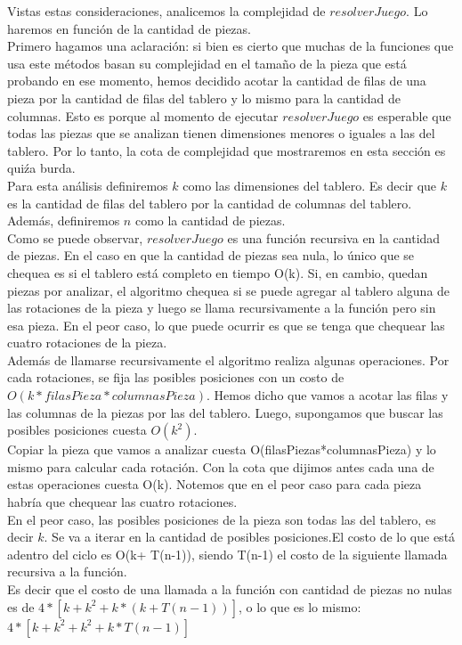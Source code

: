 \indent Vistas estas consideraciones, analicemos la complejidad de $resolverJuego$.  Lo haremos en función de la cantidad de piezas.\\
\indent Primero hagamos una aclaración: si bien es cierto que muchas de la funciones que usa este métodos basan su complejidad en el tamaño de la pieza que está probando en ese momento, hemos decidido acotar la cantidad de filas de una pieza por la cantidad de filas del tablero y lo mismo para la cantidad de columnas. Esto es porque al momento de ejecutar $resolverJuego$ es esperable que todas las piezas que se analizan tienen dimensiones menores o iguales a las del tablero. Por lo tanto, la cota de complejidad que mostraremos en esta sección es quiźa burda.\\
\indent Para esta análisis definiremos $k$ como las dimensiones del tablero. Es decir que $k$ es la cantidad de filas del tablero por la cantidad de columnas del tablero.\\ 

\indent Además, definiremos $n$ como la cantidad de piezas.\\

\indent Como se puede observar, $resolverJuego$ es una función recursiva en la cantidad de piezas. En el caso en que la cantidad de piezas sea nula, lo único que se chequea es si el tablero está completo en tiempo O(k). 
\indent Si, en cambio, quedan piezas por analizar, el algoritmo chequea si se puede agregar al tablero alguna de las rotaciones de la pieza y luego se llama recursivamente a la función pero sin esa pieza. En el peor caso, lo que puede ocurrir es que se tenga que chequear las cuatro rotaciones de la pieza.\\
\indent Adem\'as de llamarse recursivamente el algoritmo realiza algunas operaciones. Por cada rotaciones, se fija las posibles posiciones con un costo de $O(k*filasPieza*columnasPieza)$. Hemos dicho que vamos a acotar las filas y las columnas de la piezas por las del tablero. Luego, supongamos que buscar las posibles posiciones cuesta $O(k^{2})$.\\
\indent Copiar la pieza que vamos a analizar cuesta O(filasPiezas*columnasPieza) y lo mismo para calcular cada rotación. Con la cota que dijimos antes cada una de estas operaciones cuesta O(k). Notemos que en el peor caso para cada pieza habría que chequear las cuatro rotaciones.\\
\indent En el peor caso, las posibles posiciones de la pieza son todas las del tablero, es decir $k$. Se va a iterar en la cantidad de posibles posiciones.El costo de lo que está adentro del ciclo es O(k+ T(n-1)), siendo T(n-1) el costo de la siguiente llamada recursiva a la función.\\
\indent Es decir que el costo de una llamada a la función con cantidad de piezas no nulas es de $4*[k + k^{2} + k* (k+T(n-1))]$, o lo que es lo mismo:\\
$4*[k + k^{2} + k^{2} + k* T(n-1)]$\\

